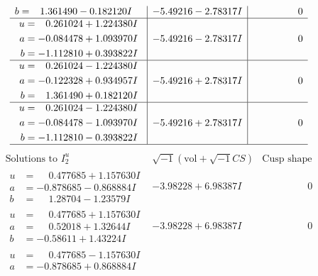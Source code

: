 \documentclass[1p]{elsarticle_modified}
\theoremstyle{definition}
\newcommand{\I}{\sqrt{-1}}
\begin{document}
$$\begin{array}{c|c|c}
\begin{aligned}
b &= \phantom{-}1.361490 - 0.182120 I\end{aligned}
 & -5.49216 - 2.78317 I & \phantom{-0.000000 } 0 \\ \hline\begin{aligned}
u &= \phantom{-}0.261024 + 1.224380 I \\
a &= -0.084478 + 1.093970 I \\
b &= -1.112810 + 0.393822 I\end{aligned}
 & -5.49216 - 2.78317 I & \phantom{-0.000000 } 0 \\ \hline\begin{aligned}
u &= \phantom{-}0.261024 - 1.224380 I \\
a &= -0.122328 + 0.934957 I \\
b &= \phantom{-}1.361490 + 0.182120 I\end{aligned}
 & -5.49216 + 2.78317 I & \phantom{-0.000000 } 0 \\ \hline\begin{aligned}
u &= \phantom{-}0.261024 - 1.224380 I \\
a &= -0.084478 - 1.093970 I \\
b &= -1.112810 - 0.393822 I\end{aligned}
 & -5.49216 + 2.78317 I & \phantom{-0.000000 } 0\\
 \hline 
 \end{array}$$\newpage$$\begin{array}{c|c|c}  
\text{Solutions to }I^u_{2}& \I (\text{vol} + \sqrt{-1}CS) & \text{Cusp shape}\\
 \hline 
\begin{aligned}
u &= \phantom{-}0.477685 + 1.157630 I \\
a &= -0.878685 - 0.868884 I \\
b &= \phantom{-}1.28704 - 1.23579 I\end{aligned}
 & -3.98228 + 6.98387 I & \phantom{-0.000000 } 0 \\ \hline\begin{aligned}
u &= \phantom{-}0.477685 + 1.157630 I \\
a &= \phantom{-}0.52018 + 1.32644 I \\
b &= -0.58611 + 1.43224 I\end{aligned}
 & -3.98228 + 6.98387 I & \phantom{-0.000000 } 0 \\ \hline\begin{aligned}
u &= \phantom{-}0.477685 - 1.157630 I \\
a &= -0.878685 + 0.868884 I \\

\end{aligned}
\end{array}$$
\end{document}
